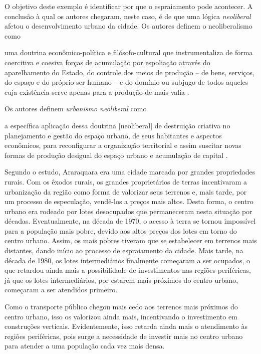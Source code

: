 O objetivo deste exemplo é identificar por que o espraiamento pode acontecer. A conclusão à qual os autores chegaram, neste caso, é de que uma lógica \emph{neoliberal} afetou o desenvolvimento urbano da cidade. Os autores definem o neoliberalismo como

\begin{displayquote}
    \textelp{} uma doutrina econômico-política e filósofo-cultural que instrumentaliza de forma coercitiva e coesiva forças de acumulação por espoliação através do aparelhamento do Estado, do controle dos meios de produção -- de bens, serviços, do espaço e do próprio ser humano -- e do domínio ou subjugo de todos aqueles cuja existência serve apenas para a produção de mais-valia \textelp{}.
\end{displayquote}
Os autores definem \emph{urbanismo neoliberal} como

\begin{displayquote}
    \textelp{} a específica aplicação dessa doutrina [neoliberal] de destruição criativa no planejamento e gestão do espaço urbano, de seus habitantes e aspectos econômicos, para reconfigurar a organização territorial e assim suscitar novas formas de produção desigual do espaço urbano e acumulação de capital \textelp{}.
\end{displayquote}

Segundo o estudo, Araraquara era uma cidade marcada por grandes propriedades rurais. Com os êxodos rurais, os grandes proprietários de terras incentivaram a urbanização da região como forma de valorizar seus terrenos e, mais tarde, por um processo de especulação, vendê-los a preços mais altos. Desta forma, o centro urbano era rodeado por lotes desocupados que permaneceram nesta situação por décadas. Eventualmente, na década de 1970, o acesso à terra se tornou impossível para a população mais pobre, devido aos altos preços dos lotes em torno do centro urbano. Assim, os mais pobres tiveram que se estabelecer em terrenos mais distantes, dando início ao processo de espraiamento da cidade. Mais tarde, na década de 1980, os lotes intermediários finalmente começaram a ser ocupados, o que retardou ainda mais a possibilidade de investimentos nas regiões periféricas, já que os lotes intermediários, por estarem mais próximos do centro urbano, começaram a ser atendidos primeiro.

Como o transporte público chegou mais cedo aos terrenos mais próximos do centro urbano, isso os valorizou ainda mais, incentivando o investimento em construções verticais. Evidentemente, isso retarda ainda mais o atendimento às regiões periféricas, pois surge a necessidade de investir mais no centro urbano para atender a uma população cada vez mais densa.

